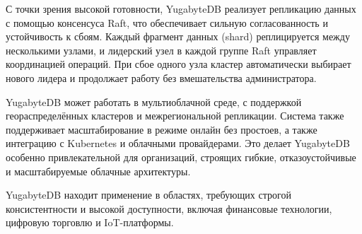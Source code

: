 С точки зрения высокой готовности, YugabyteDB реализует репликацию данных с помощью консенсуса Raft, что обеспечивает сильную согласованность и устойчивость к сбоям. Каждый фрагмент данных (shard) реплицируется между несколькими узлами, и лидерский узел в каждой группе Raft управляет координацией операций. При сбое одного узла кластер автоматически выбирает нового лидера и продолжает работу без вмешательства администратора. \autocite{Choudhury}

YugabyteDB может работать в мультиоблачной среде, с поддержкой геораспределённых кластеров и межрегиональной репликации. Система также поддерживает масштабирование в режиме онлайн без простоев, а также интеграцию с Kubernetes и облачными провайдерами. Это делает YugabyteDB особенно привлекательной для организаций, строящих гибкие, отказоустойчивые и масштабируемые облачные архитектуры.

YugabyteDB находит применение в областях, требующих строгой консистентности и высокой доступности, включая финансовые технологии, цифровую торговлю и IoT-платформы.

